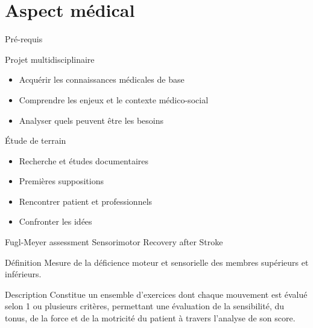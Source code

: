 \section{Aspect médical}

\begin{frame}
\end{frame}

\begin{frame}{Pré-requis}
	\begin{block}{Projet multidisciplinaire}
		\begin{itemize}
			\item Acquérir les connaissances médicales de base
			\item Comprendre les enjeux et le contexte médico-social
			\item Analyser quels peuvent être les besoins
		\end{itemize}			
	\end{block}
		\begin{block}{Étude de terrain}
		\begin{itemize}
			\item Recherche et études documentaires
			\item Premières suppositions 
			\item Rencontrer patient et professionnels 
			\item Confronter les idées
		\end{itemize}			
	\end{block}
\end{frame}

\begin{frame}{Fugl-Meyer assessment Sensorimotor Recovery after Stroke}
	\begin{block}{Définition}
Mesure de la déficience moteur et sensorielle des membres supérieurs et inférieurs.
	\end{block}
	\begin{block}{Description}
Constitue un ensemble d'exercices dont chaque mouvement est évalué selon 1 ou plusieurs critères, permettant une évaluation de la sensibilité, du tonus, de la force et de la motricité du patient à travers l'analyse de son score.
	\end{block}
\end{frame}

